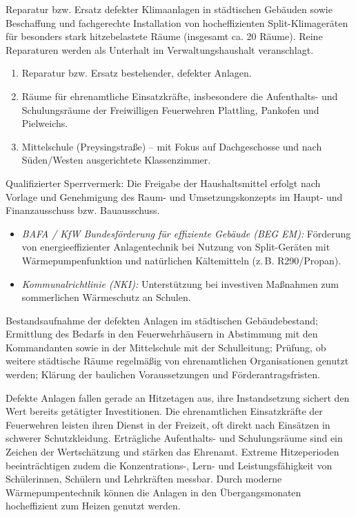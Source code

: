 \documentclass[11pt, a4paper]{article}
\begin{document}
\begin{steckbrief}
  \item[Maßnahme] Reparatur bzw. Ersatz defekter Klimaanlagen in städtischen Gebäuden sowie Beschaffung und fachgerechte Installation von hocheffizienten Split-Klimageräten für besonders stark hitzebelastete Räume (insgesamt ca. 20 Räume). Reine Reparaturen werden als Unterhalt im Verwaltungshaushalt veranschlagt.
  \item[Priorisierung] \begin{enumerate}
      \item Reparatur bzw. Ersatz bestehender, defekter Anlagen.
      \item Räume für ehrenamtliche Einsatzkräfte, insbesondere die Aufenthalts- und Schulungsräume der Freiwilligen Feuerwehren Plattling, Pankofen und Pielweichs.
      \item Mittelschule (Preysingstraße) – mit Fokus auf Dachgeschosse und nach Süden/Westen ausgerichtete Klassenzimmer.
    \end{enumerate}
  \item[Sperrvermerk] Qualifizierter Sperrvermerk: Die Freigabe der Haushaltsmittel erfolgt nach Vorlage und Genehmigung des Raum- und Umsetzungskonzepts im Haupt- und Finanzausschuss bzw. Bauausschuss.
  \item[Förderung] \begin{itemize}
      \item \textit{BAFA / KfW Bundesförderung für effiziente Gebäude (BEG EM):} Förderung von energieeffizienter Anlagentechnik bei Nutzung von Split-Geräten mit Wärmepumpenfunktion und natürlichen Kältemitteln (z.\,B. R290/Propan).
      \item \textit{Kommunalrichtlinie (NKI):} Unterstützung bei investiven Maßnahmen zum sommerlichen Wärmeschutz an Schulen.
    \end{itemize}
  \item[Arbeitsauftrag] Bestandsaufnahme der defekten Anlagen im städtischen Gebäudebestand; Ermittlung des Bedarfs in den Feuerwehrhäusern in Abstimmung mit den Kommandanten sowie in der Mittelschule mit der Schulleitung; Prüfung, ob weitere städtische Räume regelmäßig von ehrenamtlichen Organisationen genutzt werden; Klärung der baulichen Voraussetzungen und Förderantragsfristen.
  \item[Begründung] Defekte Anlagen fallen gerade an Hitzetagen aus, ihre Instandsetzung sichert den Wert bereits getätigter Investitionen. Die ehrenamtlichen Einsatzkräfte der Feuerwehren leisten ihren Dienst in der Freizeit, oft direkt nach Einsätzen in schwerer Schutzkleidung. Erträgliche Aufenthalts- und Schulungsräume sind ein Zeichen der Wertschätzung und stärken das Ehrenamt. Extreme Hitzeperioden beeinträchtigen zudem die Konzentrations-, Lern- und Leistungsfähigkeit von Schülerinnen, Schülern und Lehrkräften messbar. Durch moderne Wärmepumpentechnik können die Anlagen in den Übergangsmonaten hocheffizient zum Heizen genutzt werden.
\end{steckbrief}
\end{document}
